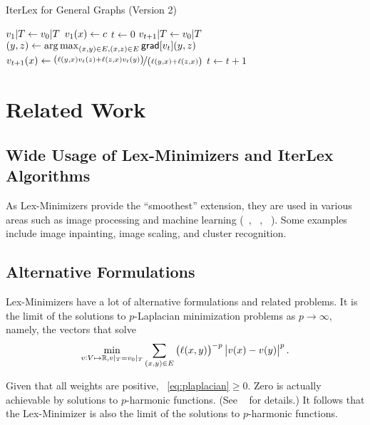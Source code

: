 \documentclass[12pt]{amsart}
\DeclareMathOperator*{\argmax}{arg\,max}
\newcommand{\grad}{\ensuremath{\mathsf{grad}}}
\begin{document}
\begin{algorithm}
    \caption{IterLex for General Graphs (Version 2)}
    \label{alg:iterlex2}
    \begin{algorithmic}[1]
        \State $v_1|T \gets v_0|T$
            \State $v_1(x) \gets c$
        \EndFor {}
        \State $t\gets 0$
            \State $v_{t+1}|T \gets v_0|T$
                \State $(y,z) \gets \argmax_{(x,y)\in E, (x,z)\in E}\grad[\V{v_t}](y,z)$
                \State $v_{t+1}(x) \gets \nicefrac{\left({\ell(y,x)v_t(z) + \ell(z,x)v_t(y)}\right)}{\left({\ell(y,x)+\ell(z,x)}\right)}$
            \EndFor
            \State $t\gets t+1$
        \EndWhile
    \end{algorithmic}
\end{algorithm}


\section{Related Work}

\subsection{Wide Usage of Lex-Minimizers and IterLex Algorithms}
As Lex-Minimizers provide the ``smoothest'' extension, they are used in various areas such as image processing and machine learning (~\cite{GEL11}, ~\cite{ADE14}, ~\cite{EDLL14}). Some examples include image inpainting, image scaling, and cluster recognition.


\subsection{Alternative Formulations}
Lex-Minimizers have a lot of alternative formulations and related problems. It is the limit of the solutions to $p$-Laplacian minimization problems as $p\to \infty$, namely, the vectors that solve
\begin{equation}\label{eq:plaplacian}
  \min_{v: V\mapsto \mathbb R, v|_T = v_0|_T} \sum_{(x,y)\in E} \left({\ell(x,y)}\right)^{-p}\left| v(x)-v(y) \right|^p.
\end{equation}

Given that all weights are positive, ~\eqref{eq:plaplacian}$\geq 0$. Zero is actually achievable by solutions to $p$-harmonic functions. (See ~\cite{And09} for details.) It follows that the Lex-Minimizer is also the limit of the solutions to $p$-harmonic functions.
\end{document}
